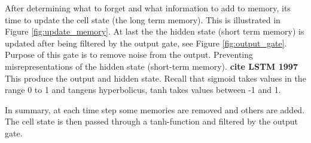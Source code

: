 \documentclass{article}
\begin{document}
After determining what to forget and what information to add to memory, its time to update the cell state (the long term memory). This is illustrated in Figure \ref{fig:update_memory}. At last the the hidden state (short term memory) is updated after being filtered by the output gate, see Figure \ref{fig:output_gate}. Purpose of this gate is to remove noise from the output. Preventing misrepresentations of the hidden state (short-term memory). \textbf{cite LSTM 1997} This produce the output and hidden state. Recall that sigmoid takes values in the range 0 to 1 and tangens hyperbolicus, tanh takes values between -1 and 1.

In summary, at each time step some memories are removed and others are added. The cell state is then passed through a tanh-function and filtered by the output gate. 
\end{document}
